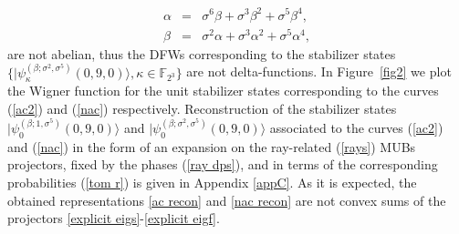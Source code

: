 \documentclass[quantumrep,article,submit,pdftex,moreauthors]{Definitions/mdpi}
\begin{document}
\begin{eqnarray}
  \alpha
  &=& \sigma^{6}\beta +\sigma^{3}\beta^{2}+\sigma^{5}\beta^{4},
  \label{nac1} \\
  \beta
  &=& \sigma^{2}\alpha +\sigma^{3}\alpha^{2}+\sigma^{5}\alpha^{4},
  \label{nac}
\end{eqnarray}
are not abelian, thus the DFWs corresponding to the stabilizer states
$\{|\psi_\kappa^{(\beta; \sigma^2, \sigma^{5})}(0,9,0)\rangle, \kappa \in
\mathbb F_{2^3}\}$ are not delta-functions. In Figure~\ref{fig2} we plot the
Wigner function for the unit stabilizer states corresponding to the curves
(\ref{ac2}) and (\ref{nac}) respectively. Reconstruction of the stabilizer
states $|\psi_{0}^{(\beta ; 1,\sigma^{5})}(0,9,0)\rangle$ and $|\psi_{0}^{(\beta
;\sigma^{2},\sigma^{5})}(0,9,0)\rangle$ associated to the curves (\ref{ac2})
and (\ref{nac}) in the form of an expansion on the ray-related (\ref{rays}) MUBs
projectors, fixed by the phases (\ref{ray dps}), and in terms of the
corresponding probabilities (\ref{tom r}) is given in Appendix \ref{appC}. As it
is expected, the obtained representations \eqref{ac recon} and \eqref{nac recon}
are not convex sums of the projectors \eqref{explicit eigs}-\eqref{explicit
eigf}.
\end{document}
